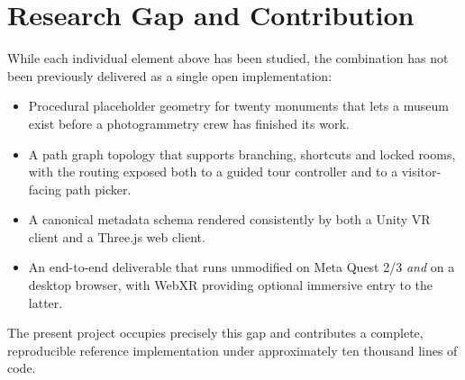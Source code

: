 \section{Research Gap and Contribution}

While each individual element above has been studied, the combination has not been previously delivered as a single open implementation:

\begin{itemize}
\item Procedural placeholder geometry for twenty monuments that lets a museum exist before a photogrammetry crew has finished its work.
\item A path graph topology that supports branching, shortcuts and locked rooms, with the routing exposed both to a guided tour controller and to a visitor-facing path picker.
\item A canonical metadata schema rendered consistently by both a Unity VR client and a Three.js web client.
\item An end-to-end deliverable that runs unmodified on Meta Quest 2/3 \emph{and} on a desktop browser, with WebXR providing optional immersive entry to the latter.
\end{itemize}

The present project occupies precisely this gap and contributes a complete, reproducible reference implementation under approximately ten thousand lines of code.
